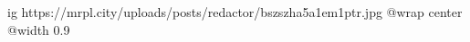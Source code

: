  
 
 
 
 

\ifcmt
  ig https://mrpl.city/uploads/posts/redactor/bszszha5a1em1ptr.jpg
  @wrap center
  @width 0.9
\fi
